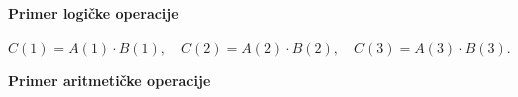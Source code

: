 \begin{frame}[label=07-s026]
\textcolor{DEcrvena}{\textbf{Primer logičke operacije}}\par\vspace{2mm}

\centering
$C(1)=A(1)\cdot B(1),\quad C(2)=A(2)\cdot B(2),\quad C(3)=A(3)\cdot B(3).$
\par\vspace{5mm}\raggedright
\textcolor{DEcrvena}{\textbf{Primer aritmetičke operacije}}\par\vspace{2mm}

\end{frame}
